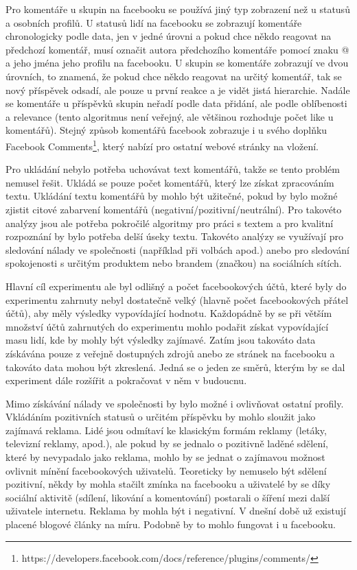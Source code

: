 \documentclass[thesis=M,czech]{FITthesis}[2013/05/10]
\begin{document}
Pro komentáře u skupin na facebooku se používá jiný typ zobrazení než u statusů a osobních profilů. U statusů lidí na facebooku se zobrazují komentáře chronologicky podle data, jen v jedné úrovni a pokud chce někdo reagovat na předchozí komentář, musí označit autora předchozího komentáře pomocí znaku @ a jeho jména jeho profilu na facebooku. U skupin se komentáře zobrazují ve dvou úrovních, to znamená, že pokud chce někdo reagovat na určitý komentář, tak se nový příspěvek odsadí, ale pouze u první reakce a je vidět jistá hierarchie. Nadále se komentáře u příspěvků skupin neřadí podle data přidání, ale podle oblíbenosti a relevance (tento algoritmus není veřejný, ale většinou rozhoduje počet like u komentářů). Stejný způsob komentářů facebook zobrazuje i u svého doplňku Facebook Comments\footnote{https://developers.facebook.com/docs/reference/plugins/comments/}, který nabízí pro ostatní webové stránky na vložení. 

Pro ukládání nebylo potřeba uchovávat text komentářů, takže se tento problém nemusel řešit. Ukládá se pouze počet komentářů, který lze získat zpracováním textu. Ukládání textu komentářů by mohlo být užitečné, pokud by bylo možné zjistit citové zabarvení komentářů (negativní/pozitivní/neutrální). Pro takovéto analýzy jsou ale potřeba pokročilé algoritmy pro práci s textem a pro kvalitní rozpoznání by bylo potřeba delší úseky textu. Takovéto analýzy se využívají pro sledování nálady ve společnosti (například při volbách apod.) anebo pro sledování spokojenosti s určitým produktem nebo brandem (značkou) na sociálních sítích. 

Hlavní cíl experimentu ale byl odlišný a počet facebookových účtů, které byly do experimentu zahrnuty nebyl dostatečně velký (hlavně počet facebookových přátel účtů), aby měly výsledky vypovídající hodnotu. Každopádně by se při větším množství účtů zahrnutých do experimentu mohlo podařit získat vypovídající masu lidí, kde by mohly být výsledky zajímavé. Zatím jsou takováto data získávána pouze z veřejně dostupných zdrojů anebo ze stránek na facebooku a takováto data mohou být zkreslená. Jedná se o jeden ze směrů, kterým by se dal experiment dále rozšířit a pokračovat v něm v budoucnu.

Mimo získávání nálady ve společnosti by bylo možné i ovlivňovat ostatní profily. Vkládáním pozitivních statusů o určitém příspěvku by mohlo sloužit jako zajímavá reklama. Lidé jsou odmítaví ke klasickým formám reklamy (letáky, televizní reklamy, apod.), ale pokud by se jednalo o pozitivně laděné sdělení, které by nevypadalo jako reklama, mohlo by se jednat o zajímavou možnost ovlivnit mínění facebookových uživatelů. Teoreticky by nemuselo být sdělení pozitivní, někdy by mohla stačilt zmínka na facebooku a uživatelé by se díky sociální aktivitě (sdílení, likování a komentování) postarali o šíření mezi další uživatele internetu. Reklama by mohla být i negativní. V dnešní době už existují placené blogové články na míru. Podobně by to mohlo fungovat i u facebooku.
\end{document}
